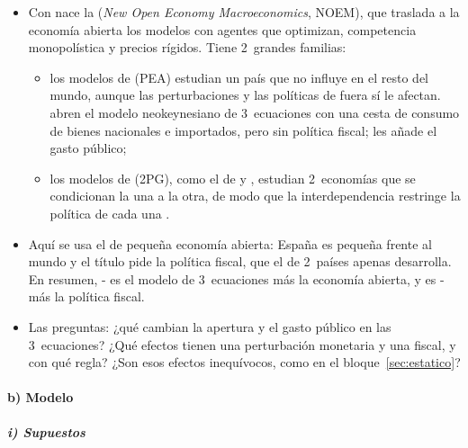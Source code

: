 \documentclass[11pt]{article}
\begin{document}
\begin{itemize}
\item Con \textcite{ObstfeldRogoff1995Redux} nace la  (\emph{New Open Economy Macroeconomics}, NOEM), que traslada a la economía abierta los modelos con agentes que optimizan, competencia monopolística y precios rígidos. Tiene 2~grandes familias:
  \begin{itemize}
  \item los modelos de  (PEA) estudian un país que no influye en el resto del mundo, aunque las perturbaciones y las políticas de fuera sí le afectan. \textcite{GaliMonacelli2005Monetary} abren el modelo neokeynesiano de 3~ecuaciones con una cesta de consumo de bienes nacionales e importados, pero sin política fiscal; \textcite{Furlanetto2006Fiscal} les añade el gasto público;
  \item los modelos de  (2PG), como el de  y , estudian 2~economías que se condicionan la una a la otra, de modo que la interdependencia restringe la política de cada una .
  \end{itemize}
\item Aquí se usa el de pequeña economía abierta: España es pequeña frente al mundo y el título pide la política fiscal, que el de 2~países apenas desarrolla. En resumen, - es el modelo de 3~ecuaciones más la economía abierta, y  es - más la política fiscal.
\item Las preguntas: ¿qué cambian la apertura y el gasto público en las 3~ecuaciones? ¿Qué efectos tienen una perturbación monetaria y una fiscal, y con qué regla? ¿Son esos efectos inequívocos, como en el bloque~\ref{sec:estatico}?
\end{itemize}

\paragraph{b) Modelo}

\subparagraph{i) Supuestos}
\end{document}
